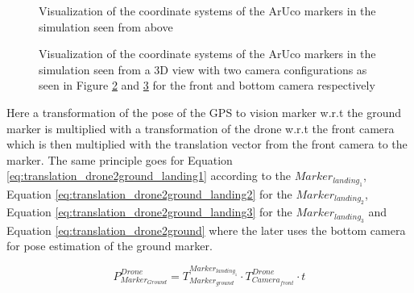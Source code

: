\documentclass[../Head/report.tex]{subfiles}
\begin{document}
 \begin{figure}[H]
    \centering
    \scalebox{1.0}{}
    \caption{Visualization of the coordinate systems of the ArUco markers in the simulation seen from above}
    \label{fig:2d_view_aruco_coordinate_systems}
\end{figure}



\begin{figure}[H]
    \centering
    \begin{subfigure}[t]{.48\textwidth}
        \centering
\scalebox{1.0}{}
		\caption{}
        \label{fig:3d_view_aruco_front_camera}
    \end{subfigure}
    \hfill
    \begin{subfigure}[t]{.48\textwidth}
        \centering
\scalebox{1.0}{}
        \caption{}
        \label{fig:3d_view_aruco_bottom_camera}
    \end{subfigure}
    \caption{Visualization of the coordinate systems of the ArUco markers in the simulation seen from a 3D view with two camera configurations as seen in Figure \ref{fig:3d_view_aruco_front_camera} and \ref{fig:3d_view_aruco_bottom_camera} for the front and bottom camera respectively}
    \label{fig:3d_view_aruco_coordinate_systems}
\end{figure}

Here a transformation of the pose of the GPS to vision marker w.r.t the ground marker is multiplied with a transformation of the drone w.r.t the front camera which is then multiplied with the translation vector from the front camera to the marker. The same principle goes for Equation \ref{eq:translation_drone2ground_landing1} according to the $Marker_{landing_1}$, Equation \ref{eq:translation_drone2ground_landing2} for the $Marker_{landing_2}$, Equation  \ref{eq:translation_drone2ground_landing3} for the  $Marker_{landing_3}$ and Equation \ref{eq:translation_drone2ground} where the later uses the bottom camera for pose estimation of the ground marker.   


\begin{equation}
	P^{Drone}_{Marker_{Ground}} = T^{Marker_{landing_1}}_{Marker_{ground}} \cdot T^{Drone}_{Camera_{front}} \cdot t
	\label{eq:translation_drone2ground_landing1}   
\end{equation}       
\end{document}
